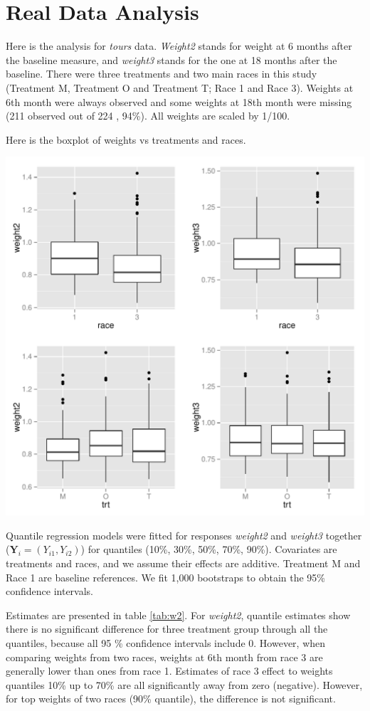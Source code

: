 \documentclass[12pt]{article}
\begin{document}
\section{Real Data Analysis}

Here is the analysis for \textit{tours} data. \textit{Weight2} stands
for weight at 6 months after the baseline measure, and
\textit{weight3} stands for the one at 18 months after the
baseline. There were three treatments and two main races in this study
(Treatment M, Treatment O and Treatment T; Race 1 and Race 3). Weights
at 6th month were always observed and some weights at 18th month were
missing (211 observed out of 224 , 94\%). All weights are scaled by
1/100.

Here is the boxplot of weights vs treatments and races.

\includegraphics{../tours/weight-plot}

Quantile regression models were fitted for responses \textit{weight2}
and \textit{weight3} together ($\bm Y_i = (Y_{i1}, Y_{i2})$) for
quantiles (10\%, 30\%, 50\%, 70\%, 90\%). Covariates are treatments
and races, and we assume their effects are additive. Treatment M and
Race 1 are baseline references. We fit 1,000 bootstraps to obtain the 
95\% confidence intervals. 

Estimates are presented in table \ref{tab:w2}. For \textit{weight2},
quantile estimates show there is no significant difference for three
treatment group through all the quantiles, because all 95 \%
confidence intervals include 0. However, when comparing weights from
two races, weights at 6th month from race 3 are generally lower than
ones from race 1. Estimates of race 3 effect to weights quantiles 10\%
up to 70\% are all significantly away from zero (negative). However,
for top weights of two races (90\% quantile), the difference is not
significant.
\end{document}
